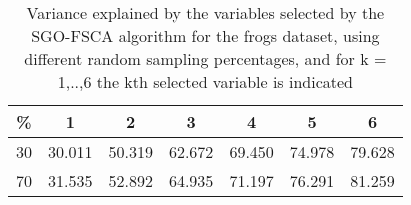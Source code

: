 \begin{table}
	\begin{center}
		\begin{tabular}{c c c c c c c}
			\% & 1 & 2 & 3 & 4 & 5 & 6 \\
			\hline
			30 & 30.011 & 50.319 & 62.672 & 69.450 & 74.978 & 79.628 \\
			70 & 31.535 & 52.892 & 64.935 & 71.197 & 76.291 & 81.259 \\
		\end{tabular}
	\end{center}
	\caption{Variance explained by the variables selected by the SGO-FSCA algorithm for the frogs dataset, using different random sampling percentages, and for k = 1,..,6 the kth selected variable is indicated}
\end{table}